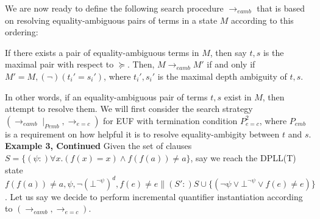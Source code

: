 \documentclass{llncs}
\begin{document}
We are now ready to define the following search procedure $\rightarrow_{eamb}$ that is based on resolving equality-ambiguous pairs of terms in a state $M$ according to this ordering:

\begin{definition}
If there exists a pair of equality-ambiguous terms in $M$, then say $t, s$ is the maximal pair with respect to $\succeq$.
Then, $M \rightarrow_{eamb} M'$ if and only if $M' = M, (\neg)(t_i' = s_i')$, where $t_i', s_i'$ is the maximal depth ambiguity of $t, s$. 
\end{definition}

In other words, if an equality-ambiguous pair of terms $t,s$ exist in $M$, then attempt to resolve them. 
We will first consider the search strategy $( \rightarrow_{eamb} \mid_{Pemb}, \rightarrow_{e=c} )$ for EUF with termination condition $P^2_{e=c}$, where $P_{emb}$ is a requirement on how helpful it is to resolve equality-ambigity between $t$ and $s$. \\

{\bf Example 3, Continued}
Given the set of clauses $S = \{ (\psi :)\forall x. (f( x ) = x) \wedge f( f( a ) ) \neq a \}$, say we reach the DPLL(T) state $f( f( a ) ) \neq a, \psi, \neg (\bot^{\neg \psi})^d, f(e) \neq e \parallel (S':)S \cup \{ ( \neg \psi \vee \bot^{\neg \psi } \vee f( e ) \neq e ) \}$.
Let us say we decide to perform incremental quantifier instantiation according to $( \rightarrow_{eamb}, \rightarrow_{e=c} )$.

\begin{comment}
THIS IS FOR COLLECTED INSTANTIATION
Our maximum pair of equality-ambiguous terms is $f( e ), f( f( a ) )$ and our maximal depth ambiguity is $e = f( a )$.
Searching the branch $e = f( a )$ leads us to a state in which $\psi$ is instantiation-ready with the instantiation $[f(a)/e]$ and $e \neq f( a )$ leads us to a state in which $f( e )$ is equality-independent and our search terminates.
Our search has thus calculated the set $\{ [f(a)/e] \}$.
By applying this instantiation, we obtain the clause $( \neg \psi \vee f( f( a ) ) = f( a ) )$, and after unit propagation we are in the state $f( f( a ) ) \neq a, \psi, \neg (\bot^{\neg \psi})^d, f(e) \neq e, f( f( a ) ) = f( a ) \parallel S'$.
Again, $\psi$ is not instantiation-ready, and we may chose to perform another round of instantiation.

Our maximum pair of equality-ambiguous terms is $f( e ), f( a )$ and our maximal depth ambiguity is $e = a$.
Searching the branch $e = a$ leads us to a state in which $\psi$ is instantiation-ready with the instantiation $[a/e]$.
Otherwise, searching the branch $e \neq a$ leads us to state where we again will split on $e = f( a )$.
In the branch $e = f( a )$, we get the theory conflict $e = f( a ), f( f( a ) ) = f( a ), f( e ) \neq e \models \bot$.
In the branch $e \neq f( a )$, we have that $f( e )$ is equality-independent and our search terminates.
Our search has thus calculated the set $\{ [a/e] \}$, and after adding the instantiation clause $( \neg \psi \vee f( a ) = a )$, the solver answers UNSAT. \\
\end{comment}
\end{document}
